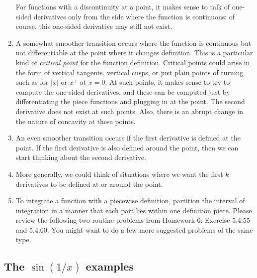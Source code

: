 \documentclass[10pt]{amsart}
\begin{document}
\begin{enumerate}
  For functions with a discontinuity at a point, it makes sense to
  talk of one-sided derivatives only from the side where the function
  is continuous; of course, this one-sided derivative may still not
  exist.
\item A somewhat smoother transition occurs where the function is
  continuous but not differentiable at the point where it changes
  definition. This is a particular kind of {\em critical point} for
  the function definition. Critical points could arise in the form of
  vertical tangents, vertical cusps, or just plain points of turning
  such as for $|x|$ or $x^+$ at $x = 0$. At such points, it makes
  sense to try to compute the one-sided derivatives, and these can be
  computed just by differentiating the piece functions and plugging in
  at the point. The second derivative does not exist at such
  points. Also, there is an abrupt change in the nature of concavity
  at these points.
\item An even smoother transition occurs if the first derivative is
  defined at the point. If the first derivative is also defined around
  the point, then we can start thinking about the second derivative.
\item More generally, we could think of situations where we want the
  first $k$ derivatives to be defined at or around the point.
\item To integrate a function with a piecewise definition, partition
  the interval of integration in a manner that each part lies within
  one definition piece. Please review the following two routine
  problems from Homework 6: Exercise 5.4.55 and 5.4.60. You might want
  to do a few more suggested problems of the same type.
\end{enumerate}

\subsection{The $\sin(1/x)$ examples}
\end{document}
